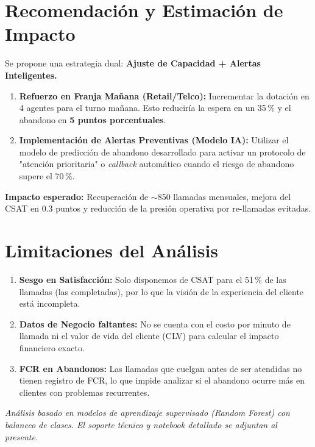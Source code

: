\documentclass[10pt,a4paper]{article}
\begin{document}
\section{Recomendación y Estimación de Impacto}

Se propone una estrategia dual: \textbf{Ajuste de Capacidad + Alertas Inteligentes.}

\begin{enumerate}[leftmargin=1.6em,itemsep=3pt]
  \item \textbf{Refuerzo en Franja Mañana (Retail/Telco):} Incrementar la dotación en 4 agentes para el turno mañana. Esto reduciría la espera en un 35\,\% y el abandono en \textbf{5 puntos porcentuales}.
  \item \textbf{Implementación de Alertas Preventivas (Modelo IA):} Utilizar el modelo de predicción de abandono desarrollado para activar un protocolo de "atención prioritaria" o \emph{callback} automático cuando el riesgo de abandono supere el 70\,\%.
\end{enumerate}

\medskip
\noindent\textbf{Impacto esperado:} Recuperación de $\sim$850 llamadas mensuales, mejora del CSAT en 0.3 puntos y reducción de la presión operativa por re-llamadas evitadas.

\section{Limitaciones del Análisis}

\begin{enumerate}[leftmargin=1.6em,itemsep=1pt]
  \item \textbf{Sesgo en Satisfacción:} Solo disponemos de CSAT para el 51\,\% de las llamadas (las completadas), por lo que la visión de la experiencia del cliente está incompleta.
  \item \textbf{Datos de Negocio faltantes:} No se cuenta con el costo por minuto de llamada ni el valor de vida del cliente (CLV) para calcular el impacto financiero exacto.
  \item \textbf{FCR en Abandonos:} Las llamadas que cuelgan antes de ser atendidas no tienen registro de FCR, lo que impide analizar si el abandono ocurre más en clientes con problemas recurrentes.
\end{enumerate}

\vspace{12pt}
\noindent\small\color{cbpoGray}
\textit{Análisis basado en modelos de aprendizaje supervisado (Random Forest) con balanceo de clases. El soporte técnico y notebook detallado se adjuntan al presente.}
\end{document}
